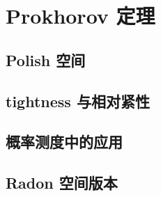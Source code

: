 \section{Prokhorov 定理}
\label{b1:sec:1204}


\subsection{Polish 空间}
\label{b1:subsec:120401}

\subsection{tightness 与相对紧性}
\label{b1:subsec:120402}

\subsection{概率测度中的应用}
\label{b1:subsec:120403}

\subsection{Radon 空间版本}
\label{b1:subsec:120404}


